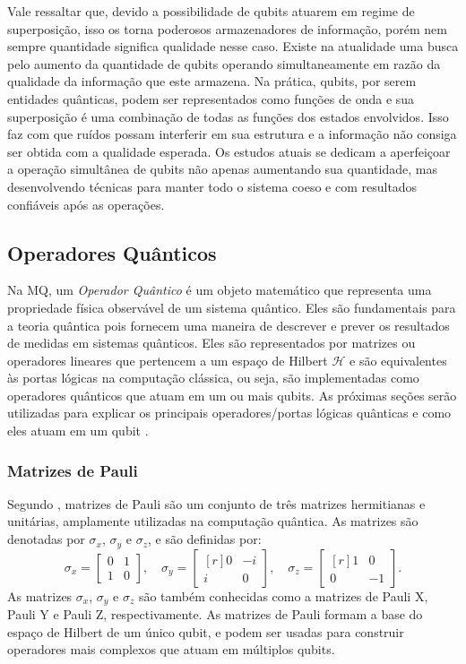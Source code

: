 Vale ressaltar que, devido a possibilidade de qubits atuarem em regime de superposição, isso os torna poderosos armazenadores de informação, porém nem sempre quantidade significa qualidade nesse caso. Existe na atualidade uma busca pelo aumento da quantidade de qubits operando simultaneamente em razão da qualidade da informação que este armazena. Na prática, qubits, por serem entidades quânticas, podem ser representados como funções de onda e sua superposição é uma combinação de todas as funções dos estados envolvidos. Isso faz com que ruídos possam interferir em sua estrutura e a informação não consiga ser obtida com a qualidade esperada. Os estudos atuais se dedicam a aperfeiçoar a operação simultânea de qubits não apenas aumentando sua quantidade, mas desenvolvendo técnicas para manter todo o sistema coeso e com resultados confiáveis após as operações.

\subsection{Operadores Quânticos}\label{sec:opquantico}

Na MQ, um \textit{Operador Quântico} é um objeto matemático que representa uma propriedade física observável de um sistema quântico. Eles são fundamentais para a teoria quântica pois fornecem uma maneira de descrever e prever os resultados de medidas em sistemas quânticos. Eles são representados por matrizes ou operadores lineares que pertencem a um espaço de Hilbert \(\mathcal{H}\) e são equivalentes às portas lógicas na computação clássica, ou seja, são implementadas como operadores quânticos que atuam em um ou mais qubits. As próximas seções serão utilizadas para explicar os principais operadores/portas lógicas quânticas e como eles atuam em um qubit \cite{jorcuvich}.

\subsubsection{Matrizes de Pauli}\label{sec:pauli}

Segundo \textcite{chuang}, matrizes de Pauli são um conjunto de três matrizes hermitianas e unitárias, amplamente utilizadas na computação quântica. As matrizes são denotadas por $\sigma_x$, $\sigma_y$ e $\sigma_z$, e são definidas por:
\begin{equation}
\sigma_x=\begin{bmatrix}
0 & 1 \\
1 & 0
\end{bmatrix}, \quad \sigma_y=\begin{bmatrix*}[r]
0 & -i \\
i & 0
\end{bmatrix*}, \quad \sigma_z=\begin{bmatrix*}[r]
1 & 0 \\
0 & -1
\end{bmatrix*}.
\end{equation}
As matrizes $\sigma_x$, \(\sigma_{y}\) e \(\sigma_{z}\) são também conhecidas como a matrizes de Pauli X, Pauli Y e Pauli Z, respectivamente. As matrizes de Pauli formam a base do espaço de Hilbert de um único qubit, e podem ser usadas para construir operadores mais complexos que atuam em múltiplos qubits.

